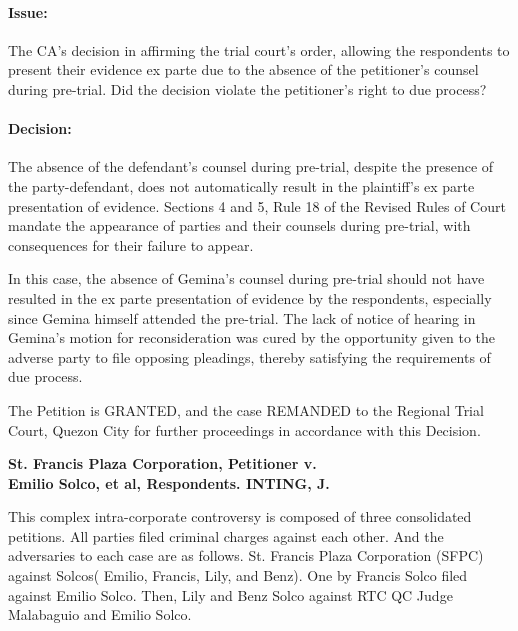 \documentclass[
12pt,
oneside,
onehalfspacing,
headsepline
]{DigestCollection}
\begin{document}
\paragraph{Issue:}
\label{bbf4c050-09fd-11ef-932c-63c852f65e48}


The CA's decision in affirming the trial court's order, allowing the respondents to present their evidence ex parte due to the absence of the petitioner's counsel during pre-trial. Did the decision violate the petitioner's right to due process?

\paragraph{Decision:}
\label{be60b740-09fd-11ef-932c-63c852f65e48}


The absence of the defendant's counsel during pre-trial, despite the presence of the party-defendant, does not automatically result in the plaintiff's ex parte presentation of evidence. Sections 4 and 5, Rule 18 of the Revised Rules of Court mandate the appearance of parties and their counsels during pre-trial, with consequences for their failure to appear.

In this case, the absence of Gemina's counsel during pre-trial should not have resulted in the ex parte presentation of evidence by the respondents, especially since Gemina himself attended the pre-trial. The lack of notice of hearing in Gemina's motion for reconsideration was cured by the opportunity given to the adverse party to file opposing pleadings, thereby satisfying the requirements of due process.

The Petition is GRANTED, and the case REMANDED to the Regional Trial Court, Quezon City for further proceedings in accordance with this Decision.

\label{ef9129f0-0a0f-11ef-932c-63c852f65e48}


\noindent\textbf{St. Francis Plaza Corporation, Petitioner v. \\Emilio Solco, et al, Respondents. INTING, J.}\vspace{0.4cm}

This complex intra-corporate controversy is composed of three consolidated petitions. All parties filed criminal charges against each other. And the adversaries to each case are as follows. St. Francis Plaza Corporation (SFPC) against Solcos( Emilio, Francis, Lily, and Benz). One by Francis Solco filed against Emilio Solco. Then, Lily and Benz Solco against RTC QC Judge Malabaguio and Emilio Solco.
\end{document}
